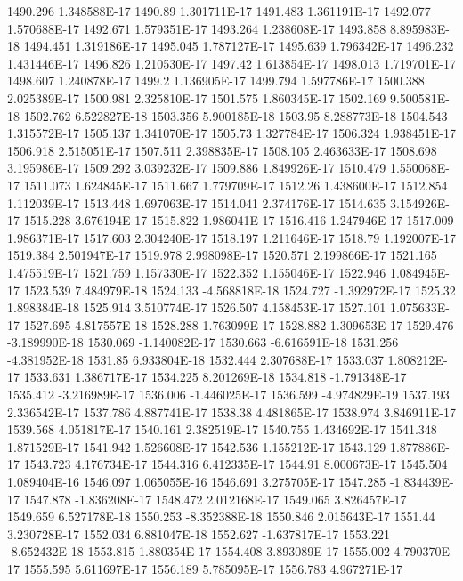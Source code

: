 1490.296  1.348588E-17
1490.89  1.301711E-17
1491.483  1.361191E-17
1492.077  1.570688E-17
1492.671  1.579351E-17
1493.264  1.238608E-17
1493.858  8.895983E-18
1494.451  1.319186E-17
1495.045  1.787127E-17
1495.639  1.796342E-17
1496.232  1.431446E-17
1496.826  1.210530E-17
1497.42  1.613854E-17
1498.013  1.719701E-17
1498.607  1.240878E-17
1499.2  1.136905E-17
1499.794  1.597786E-17
1500.388  2.025389E-17
1500.981  2.325810E-17
1501.575  1.860345E-17
1502.169  9.500581E-18
1502.762  6.522827E-18
1503.356  5.900185E-18
1503.95  8.288773E-18
1504.543  1.315572E-17
1505.137  1.341070E-17
1505.73  1.327784E-17
1506.324  1.938451E-17
1506.918  2.515051E-17
1507.511  2.398835E-17
1508.105  2.463633E-17
1508.698  3.195986E-17
1509.292  3.039232E-17
1509.886  1.849926E-17
1510.479  1.550068E-17
1511.073  1.624845E-17
1511.667  1.779709E-17
1512.26  1.438600E-17
1512.854  1.112039E-17
1513.448  1.697063E-17
1514.041  2.374176E-17
1514.635  3.154926E-17
1515.228  3.676194E-17
1515.822  1.986041E-17
1516.416  1.247946E-17
1517.009  1.986371E-17
1517.603  2.304240E-17
1518.197  1.211646E-17
1518.79  1.192007E-17
1519.384  2.501947E-17
1519.978  2.998098E-17
1520.571  2.199866E-17
1521.165  1.475519E-17
1521.759  1.157330E-17
1522.352  1.155046E-17
1522.946  1.084945E-17
1523.539  7.484979E-18
1524.133  -4.568818E-18
1524.727  -1.392972E-17
1525.32  1.898384E-18
1525.914  3.510774E-17
1526.507  4.158453E-17
1527.101  1.075633E-17
1527.695  4.817557E-18
1528.288  1.763099E-17
1528.882  1.309653E-17
1529.476  -3.189990E-18
1530.069  -1.140082E-17
1530.663  -6.616591E-18
1531.256  -4.381952E-18
1531.85  6.933804E-18
1532.444  2.307688E-17
1533.037  1.808212E-17
1533.631  1.386717E-17
1534.225  8.201269E-18
1534.818  -1.791348E-17
1535.412  -3.216989E-17
1536.006  -1.446025E-17
1536.599  -4.974829E-19
1537.193  2.336542E-17
1537.786  4.887741E-17
1538.38  4.481865E-17
1538.974  3.846911E-17
1539.568  4.051817E-17
1540.161  2.382519E-17
1540.755  1.434692E-17
1541.348  1.871529E-17
1541.942  1.526608E-17
1542.536  1.155212E-17
1543.129  1.877886E-17
1543.723  4.176734E-17
1544.316  6.412335E-17
1544.91  8.000673E-17
1545.504  1.089404E-16
1546.097  1.065055E-16
1546.691  3.275705E-17
1547.285  -1.834439E-17
1547.878  -1.836208E-17
1548.472  2.012168E-17
1549.065  3.826457E-17
1549.659  6.527178E-18
1550.253  -8.352388E-18
1550.846  2.015643E-17
1551.44  3.230728E-17
1552.034  6.881047E-18
1552.627  -1.637817E-17
1553.221  -8.652432E-18
1553.815  1.880354E-17
1554.408  3.893089E-17
1555.002  4.790370E-17
1555.595  5.611697E-17
1556.189  5.785095E-17
1556.783  4.967271E-17
